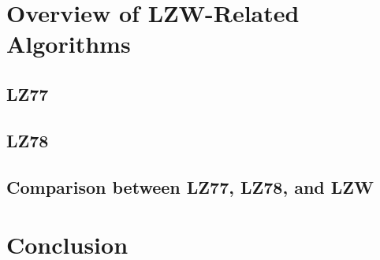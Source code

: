 \documentclass[12pt, a4paper]{article}
\begin{document}
\section{Overview of LZW-Related Algorithms}

\subsection{LZ77}

\subsection{LZ78}

\subsection{Comparison between LZ77, LZ78, and LZW}

\newpage


\section{Conclusion}

\newpage

{}

% 
\end{document}
